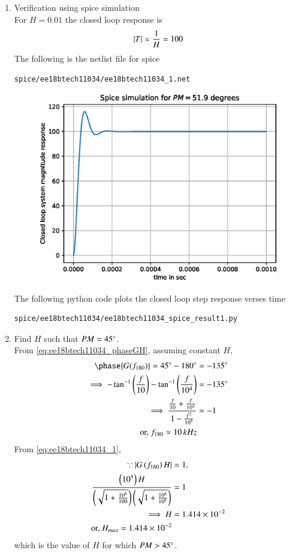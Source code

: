 \begin{enumerate}[label=\arabic*.,ref=\theenumi]
\item Verification using spice simulation\\
\solution For $H=0.01$ the closed loop response is
\begin{align}
\left\vert T\right\vert \approx \frac{1}{H} = 100
\end{align}
The following is the netlist file for spice
\begin{lstlisting}
spice/ee18btech11034/ee18btech11034_1.net
\end{lstlisting}
\begin{figure}[!h]
\centering
\includegraphics[width=\columnwidth]{./figs/ee18btech11034/ee18btech11034_spice_result1.eps}
\caption{}
\label{fig:ee18btech11034_spice_result1}
\end{figure}
The following python code plots the closed loop step response verses time
\begin{lstlisting}
spice/ee18btech11034/ee18btech11034_spice_result1.py
\end{lstlisting}
%
\item Find $H$ such that $PM = 45\degree$.
\\
\solution From \eqref{eq:ee18btech11034_phaseGH},
assuming constant $H$,
\begin{align}
\phase{G(f_{180})} = 45\degree - 180 \degree &=  -135\degree
\\
\implies -\tan^{-1}\brak{\frac{f}{10}} -\tan^{-1}\brak{\frac{f}{10^{4}}}  &= -135\degree
\\
\implies     \frac{\frac{f}{10} + \frac{f}{10^{4}}}{1-\frac{f^2}{10^{5}}} &= -1
\\
\text{or, }    f_{180} \approx 10 \, kHz
\end{align}
From \eqref{eq:ee18btech11034_1},
\begin{align}
\because  \left\vert G\left(f_{180}\right)H\right\vert&=1,
\\
  \frac{\left(10^{5}\right)H}{\left(\sqrt{1+\frac{10^{8}}{100}}\right)\left(\sqrt{1+\frac{10^{8}}{10^{8}}}\right)} &= 1
\\
\implies     H &= 1.414 \times 10^{-2}
    \\
  \text{or, }  H_{max} =  1.414 \times 10^{-2}
\end{align}
which is the value of $H$ for which $PM > 45\degree$.


\end{enumerate}
